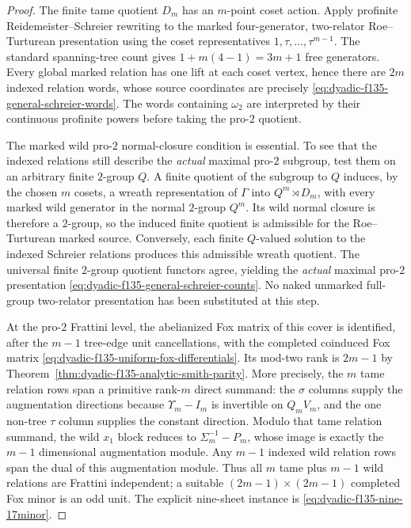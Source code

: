 \begin{proof}
The finite tame
quotient
$D_m$ has an
$m$-point coset
action.
Apply profinite
Reidemeister--Schreier
rewriting to the
marked
four-generator,
two-relator
Roe--Turturean
presentation using
the coset
representatives
$1,\tau,\ldots,
\tau^{m-1}$.
The standard
spanning-tree count
gives
$1+m(4-1)=3m+1$
free generators.
Every global
marked relation
has one lift
at each coset
vertex, hence
there are
$2m$ indexed
relation words,
whose source
coordinates
are precisely
\eqref{eq:dyadic-f135-general-schreier-words}.
The words
containing
$\omega_2$
are interpreted
by their
continuous
profinite powers
before taking
the pro-$2$
quotient.

The marked
wild pro-$2$
normal-closure
condition is
essential.
To see that the
indexed relations
still describe
the \emph{actual}
maximal pro-$2$
subgroup,
test them on an
arbitrary finite
$2$-group $Q$.
A finite quotient
of the subgroup
to $Q$ induces,
by the chosen
$m$ cosets,
a wreath
representation
of $\Gamma$
into
$Q^m\rtimes D_m$,
with every marked
wild generator
in the normal
$2$-group $Q^m$.
Its wild normal
closure is
therefore a
$2$-group, so
the induced
finite quotient
is admissible
for the
Roe--Turturean
marked source.
Conversely,
each finite
$Q$-valued
solution to
the indexed
Schreier relations
produces this
admissible
wreath quotient.
The universal
finite $2$-group
quotient functors
agree, yielding
the \emph{actual}
maximal pro-$2$
presentation
\eqref{eq:dyadic-f135-general-schreier-counts}.
No naked
unmarked
full-group
two-relator
presentation
has been
substituted
at this step.

At the
pro-$2$
Frattini
level, the
abelianized Fox
matrix of this
cover is
identified,
after the
$m-1$ tree-edge
unit cancellations,
with the
completed
coinduced
Fox matrix
\eqref{eq:dyadic-f135-uniform-fox-differentials}.
Its mod-two
rank is $2m-1$
by
Theorem~\ref{thm:dyadic-f135-analytic-smith-parity}.
More precisely,
the $m$ tame
relation rows
span a
primitive
rank-$m$
direct summand:
the $\sigma$
columns supply
the augmentation
directions because
$\Upsilon_m-I_m$
is invertible
on $Q_mV_m$,
and the one
non-tree $\tau$
column supplies
the constant
direction.
Modulo that
tame relation
summand, the
wild $x_1$
block reduces to
$\Sigma_m^{-1}-P_m$,
whose image is
exactly the
$m-1$ dimensional
augmentation module.
Any $m-1$
indexed wild
relation rows
span the dual
of this
augmentation
module.
Thus all
$m$ tame plus
$m-1$ wild
relations
are Frattini
independent;
a suitable
$(2m-1)\times
(2m-1)$
completed Fox
minor is an
odd unit.
The explicit
nine-sheet
instance is
\eqref{eq:dyadic-f135-nine-17minor}.


\end{proof}
